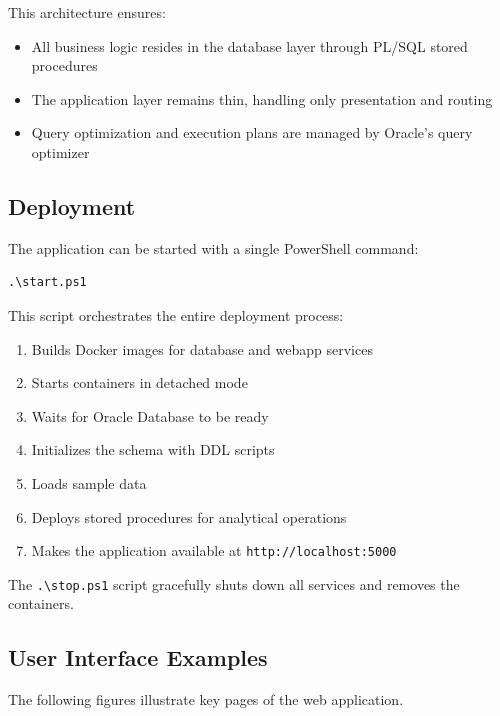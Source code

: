 \documentclass[11pt,a4paper]{article}
\begin{document}
This architecture ensures:
\begin{itemize}
    \item All business logic resides in the database layer through PL/SQL stored procedures
    \item The application layer remains thin, handling only presentation and routing
    \item Query optimization and execution plans are managed by Oracle's query optimizer
\end{itemize}

\subsection{Deployment}

The application can be started with a single PowerShell command:
\begin{verbatim}
.\start.ps1
\end{verbatim}

This script orchestrates the entire deployment process:
\begin{enumerate}
    \item Builds Docker images for database and webapp services
    \item Starts containers in detached mode
    \item Waits for Oracle Database to be ready
    \item Initializes the schema with DDL scripts
    \item Loads sample data
    \item Deploys stored procedures for analytical operations
    \item Makes the application available at \texttt{http://localhost:5000}
\end{enumerate}

The \texttt{.\textbackslash stop.ps1} script gracefully shuts down all services and removes the containers.

\subsection{User Interface Examples}

The following figures illustrate key pages of the web application.
\end{document}
